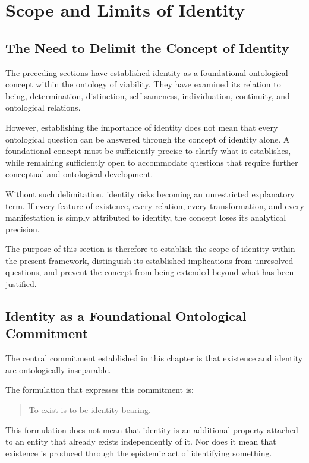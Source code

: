 
\section{Scope and Limits of Identity}
\label{sec:scope-and-limits-of-identity}

\subsection{The Need to Delimit the Concept of Identity}

The preceding sections have established identity as a foundational ontological concept within the ontology of viability. They have examined its relation to being, determination, distinction, self-sameness, individuation, continuity, and ontological relations.

However, establishing the importance of identity does not mean that every ontological question can be answered through the concept of identity alone. A foundational concept must be sufficiently precise to clarify what it establishes, while remaining sufficiently open to accommodate questions that require further conceptual and ontological development.

Without such delimitation, identity risks becoming an unrestricted explanatory term. If every feature of existence, every relation, every transformation, and every manifestation is simply attributed to identity, the concept loses its analytical precision.

The purpose of this section is therefore to establish the scope of identity within the present framework, distinguish its established implications from unresolved questions, and prevent the concept from being extended beyond what has been justified.

\subsection{Identity as a Foundational Ontological Commitment}

The central commitment established in this chapter is that existence and identity are ontologically inseparable.

The formulation that expresses this commitment is:

\begin{quote}
To exist is to be identity-bearing.
\end{quote}

This formulation does not mean that identity is an additional property attached to an entity that already exists independently of it. Nor does it mean that existence is produced through the epistemic act of identifying something.


